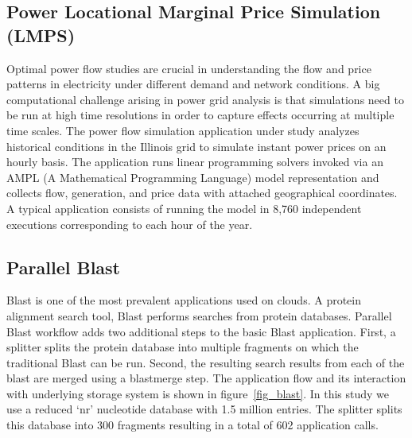 \documentclass[10pt,journal,cspaper,compsoc]{IEEEtran}
\begin{document}
\subsection{Power Locational Marginal Price Simulation (LMPS)}
Optimal power flow studies are crucial in understanding the flow and price
patterns in electricity under different demand and network conditions. A big
computational challenge arising in power grid analysis is that simulations need
to be run at high time resolutions in order to capture effects occurring at
multiple time scales. The power flow simulation application under study
analyzes historical conditions in the Illinois grid to simulate instant power
prices on an hourly basis. The application runs linear programming solvers
invoked via an AMPL (A Mathematical Programming Language) model
representation and collects flow, generation, and price data with attached
geographical coordinates. A typical application consists of running the model
in 8,760 independent executions corresponding to each hour of the year.
%
%

\subsection{Parallel Blast}
Blast is one of the most prevalent applications used on clouds. A protein
alignment search tool, Blast performs searches from protein databases. Parallel
Blast workflow adds two additional steps to the basic Blast application. First,
a splitter splits the protein database into multiple fragments on which the
traditional Blast can be run. Second, the resulting search results from each of
the blast are merged using a blastmerge step. The application flow and its
interaction with underlying storage system is shown in figure~\ref{fig_blast}.
In this study we use a reduced `nr' nucleotide database with 1.5 million
entries. The splitter splits this database into 300 fragments resulting in a
total of 602 application calls.
\end{document}
